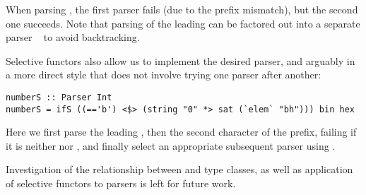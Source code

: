 \noindent
When parsing , the first parser fails (due to the prefix mismatch),
but the second one succeeds. Note that parsing of the leading  can be
factored out into a separate parser ~ to avoid backtracking.

Selective functors also allow us to implement the desired parser, and arguably
in a more direct style that does not involve trying one parser after another:

\vspace{1mm}
\begin{verbatim}
numberS :: Parser Int
numberS = ifS ((=='b') <$> (string "0" *> sat (`elem` "bh"))) bin hex
\end{verbatim}
\vspace{1mm}

\noindent
Here we first parse the leading , then the second character of the
prefix, failing if it is neither  nor , and finally select an
appropriate subsequent parser using .

Investigation of the relationship between  and 
type classes, as well as application of selective functors to parsers is left
for future work.
